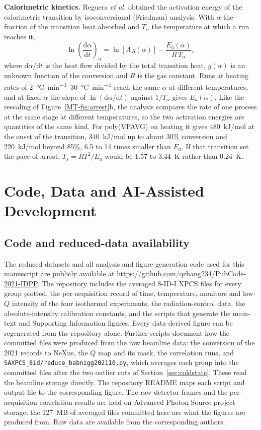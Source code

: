 \documentclass[11pt]{article}
\begin{document}
\textbf{Calorimetric kinetics.} Reguera \textit{et al.} obtained the activation energy of the calorimetric transition by isoconversional (Friedman) analysis.\cite{Reguera2003-ma} With $\alpha$ the fraction of the transition heat absorbed and $T_\alpha$ the temperature at which a run reaches it,
\begin{equation}
 \ln\!\left(\frac{\mathrm{d}\alpha}{\mathrm{d}t}\right)_{\!\alpha}=\ln\!\left[A\,g(\alpha)\right]-\frac{E_a(\alpha)}{R\,T_\alpha},
 \label{eq:si-friedman}
\end{equation}
where $\mathrm{d}\alpha/\mathrm{d}t$ is the heat flow divided by the total transition heat, $g(\alpha)$ is an unknown function of the conversion and $R$ is the gas constant. Runs at heating rates of \SIrange{2}{30}{\degreeCelsius\per\minute} reach the same $\alpha$ at different temperatures, and at fixed $\alpha$ the slope of $\ln(\mathrm{d}\alpha/\mathrm{d}t)$ against $1/T_\alpha$ gives $E_a(\alpha)$. Like the rescaling of Figure~\ref*{MT-fig:arrest}b, the analysis compares the rate of one process at the same stage at different temperatures, so the two activation energies are quantities of the same kind. For poly(VPAVG) on heating it gives 480~kJ/mol at the onset of the transition, 340~kJ/mol up to about 30\% conversion and 220~kJ/mol beyond 85\%, 6.5 to 14 times smaller than $E_a$. If that transition set the pace of arrest, $T_s=RT^2/E_a$ would be 1.57 to 3.44~K rather than 0.24~K.

\section{Code, Data and AI-Assisted Development}
\label{sec:code}
\subsection{Code and reduced-data availability}
\label{sec:availability}
The reduced datasets and all analysis and figure-generation code used for this manuscript are publicly available at \url{https://github.com/qzhang234/PubCode-2021-IDPP}. The repository includes the averaged 8-ID-I XPCS files for every group plotted, the per-acquisition record of time, temperature, monitors and low-$Q$ intensity of the four isothermal experiments, the radiation-control data, the absolute-intensity calibration constants, and the scripts that generate the main-text and Supporting Information figures. Every data-derived figure can be regenerated from the repository alone. Further scripts document how the committed files were produced from the raw beamline data: the conversion of the 2021 records to NeXus, the $Q$ map and its mask, the correlation runs, and \texttt{SAXPCS\_8id/reduce\_babnigg202110.py}, which averages each group into the committed files after the two outlier cuts of Section~\ref{sec:coldstate}. These read the beamline storage directly. The repository README maps each script and output file to the corresponding figure. The raw detector frames and the per-acquisition correlation results are held on Advanced Photon Source project storage; the 127~MB of averaged files committed here are what the figures are produced from. Raw data are available from the corresponding authors.
\end{document}
